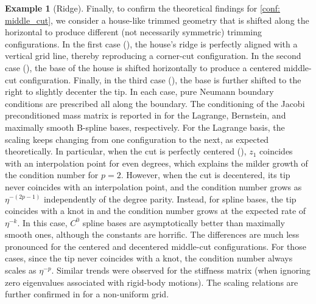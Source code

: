 \documentclass{article}
\numberwithin{equation}{section}
\theoremstyle{definition}
\newtheorem{example}[definition]{Example}
\begin{document}
\begin{example}[Ridge]
\label{ex: ridge}
Finally, to confirm the theoretical findings for \ref{conf: middle_cut}, we consider a house-like trimmed geometry that is shifted along the horizontal to produce different (not necessarily symmetric) trimming configurations. In the first case (), the house's ridge is perfectly aligned with a vertical grid line, thereby reproducing a corner-cut configuration. In the second case (), the base of the house is shifted horizontally to produce a centered middle-cut configuration. Finally, in the third case (), the base is further shifted to the right to slightly decenter the tip. In each case, pure Neumann boundary conditions are prescribed all along the boundary. The conditioning of the Jacobi preconditioned mass matrix is reported in  for the Lagrange, Bernstein, and maximally smooth B-spline bases, respectively. For the Lagrange basis, the scaling keeps changing from one configuration to the next, as expected theoretically. In particular, when the cut is perfectly centered (), $z_1$ coincides with an interpolation point for even degrees, which explains the milder growth of the condition number for $p=2$. However, when the cut is decentered, its tip never coincides with an interpolation point, and the condition number grows as $\eta^{-(2p-1)}$ independently of the degree parity. Instead, for spline bases, the tip coincides with a knot in  and the condition number grows at the expected rate of $\eta^{-k}$. In this case, $C^0$ spline bases are asymptotically better than maximally smooth ones, although the constants are horrific. The differences are much less pronounced for the centered and decentered middle-cut configurations. For those cases, since the tip never coincides with a knot, the condition number always scales as $\eta^{-p}$. Similar trends were observed for the stiffness matrix (when ignoring zero eigenvalues associated with rigid-body motions). The scaling relations are further confirmed in  for a non-uniform grid.


\end{example}
\end{document}
